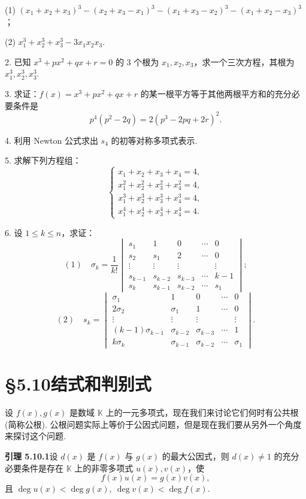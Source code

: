 \documentclass[UTF8,12pt,a4paper,fontset=fandol]{ctexart}
\begin{document}
(1) $(x_1+x_2+x_3)^3-(x_2+x_3-x_1)^3-(x_1+x_3-x_2)^3-(x_1+x_2-x_3)^3$；

(2) $x_1^3+x_2^3+x_3^3-3x_1x_2x_3$.

2. 已知 $x^3+px^2+qx+r=0$ 的 3 个根为 $x_1,x_2,x_3$，求一个三次方程，其根为 $x_1^3,x_2^3,x_3^3$.

3. 求证：$f(x)=x^3+px^2+qx+r$ 的某一根平方等于其他两根平方和的充分必要条件是
\[
p^4(p^2-2q)=2(p^3-2pq+2r)^2.
\]

4. 利用 Newton 公式求出 $s_4$ 的初等对称多项式表示.

5. 求解下列方程组：
\[
\begin{cases}
x_1+x_2+x_3+x_4=4,\\
x_1^2+x_2^2+x_3^2+x_4^2=4,\\
x_1^3+x_2^3+x_3^3+x_4^3=4,\\
x_1^4+x_2^4+x_3^4+x_4^4=4.
\end{cases}
\]

6. 设 $1\leq k\leq n$，求证：
\[
(1)\quad \sigma_k=\frac1{k!}
\begin{vmatrix}
s_1&1&0&\cdots&0\\
s_2&s_1&2&\cdots&0\\
\vdots&\vdots&\vdots&&\vdots\\
s_{k-1}&s_{k-2}&s_{k-3}&\cdots&k-1\\
s_k&s_{k-1}&s_{k-2}&\cdots&s_1
\end{vmatrix};
\]
\[
(2)\quad s_k=
\begin{vmatrix}
\sigma_1&1&0&\cdots&0\\
2\sigma_2&\sigma_1&1&\cdots&0\\
\vdots&\vdots&\vdots&&\vdots\\
(k-1)\sigma_{k-1}&\sigma_{k-2}&\sigma_{k-3}&\cdots&1\\
k\sigma_k&\sigma_{k-1}&\sigma_{k-2}&\cdots&\sigma_1
\end{vmatrix}.
\]

\section*{§5.10\quad 结式和判别式}

设 $f(x),g(x)$ 是数域 $\mathbb{K}$ 上的一元多项式，现在我们来讨论它们何时有公共根 (简称公根). 公根问题实际上等价于公因式问题，但是现在我们要从另外一个角度来探讨这个问题.

\noindent\textbf{引理 5.10.1}\quad 设 $d(x)$ 是 $f(x)$ 与 $g(x)$ 的最大公因式，则 $d(x)\neq 1$ 的充分必要条件是存在 $\mathbb{K}$ 上的非零多项式 $u(x),v(x)$，使
\begin{equation}
f(x)u(x)=g(x)v(x),
\tag{5.10.1}
\end{equation}
且 $\deg u(x)<\deg g(x),\ \deg v(x)<\deg f(x)$.
\end{document}
